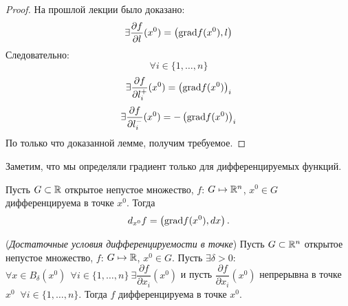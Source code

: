 \begin{proof}
    На прошлой лекции было доказано:
    $$\exists \dfrac{\partial f}{\partial l} (x^0) = \left( \textup{grad} f(x^0), l\right)$$
    Следовательно:
    $$\forall i \in \{1, \ldots, n\}$$
    $$\exists \dfrac{\partial f}{\partial l_i^{+}} (x^0) = \left( \textup{grad} f(x^0) \right)_i$$
    $$\exists \dfrac{\partial f}{\partial l_i^{-}} (x^0) = -\left( \textup{grad} f(x^0) \right)_i$$
    По только что доказанной лемме, получим требуемое.
\end{proof}

\begin{note}
    Заметим, что мы определяли градиент только для дифференцируемых функций.
\end{note}

\begin{corollary}
    Пусть $G \subset \mathbb{R}$ открытое непустое множество, $f$: $G \mapsto \mathbb{R}^{n}$, $x^{0} \in G$ дифференцируема в точке $x^0.$ Тогда 
    $$d_{x^0}f = \left(\textup{grad}f(x^0), dx \right).$$
\end{corollary}

\begin{theorem}
    (\textit{Достаточные условия дифференцируемости в точке})  Пусть $G \subset \mathbb{R}^{n}$ открытое непустое множество, $f$: $G \mapsto \mathbb{R}$, $x^{0} \in G.$ Пусть $\exists \delta > 0$: $\forall x \in B_{\delta}(x^0) \ \ \forall i \in \{1, \ldots, n\} \ \exists \dfrac{\partial f}{\partial x_i} (x^{0})$ и пусть $\dfrac{\partial f}{\partial x_i} (x^0)$ непрерывна в точке $x^0$ $ \ \forall i \in \{1, \ldots, n\}.$ Тогда $f$ дифференцируема в точке $x^{0}$.
\end{theorem}

